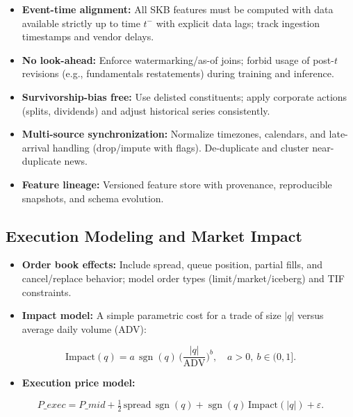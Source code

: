 \documentclass[11pt,a4paper]{article}
\begin{document}
\begin{itemize}
\item   \textbf{Event-time alignment:} All SKB features must be computed with data available strictly up to time $t^{-}$ with explicit data lags; track ingestion timestamps and vendor delays.
\item   \textbf{No look-ahead:} Enforce watermarking/as-of joins; forbid usage of post-$t$ revisions (e.g., fundamentals restatements) during training and inference.
\item   \textbf{Survivorship-bias free:} Use delisted constituents; apply corporate actions (splits, dividends) and adjust historical series consistently.
\item   \textbf{Multi-source synchronization:} Normalize timezones, calendars, and late-arrival handling (drop/impute with flags). De-duplicate and cluster near-duplicate news.
\item   \textbf{Feature lineage:} Versioned feature store with provenance, reproducible snapshots, and schema evolution.

\end{itemize}
\subsection{Execution Modeling and Market Impact}

\begin{itemize}
\item   \textbf{Order book effects:} Include spread, queue position, partial fills, and cancel/replace behavior; model order types (limit/market/iceberg) and TIF constraints.
\item   \textbf{Impact model:} A simple parametric cost for a trade of size $|q|$ versus average daily volume (ADV):

\end{itemize}
\begin{equation}
\text{Impact}(q) = a\,\operatorname{sgn}(q)\,\Big(\frac{|q|}{\mathrm{ADV}}\Big)^b,\quad a>0,\ b\in(0,1].
\end{equation}

\begin{itemize}
\item   \textbf{Execution price model:}

\end{itemize}
\begin{equation}
P\_{exec} = P\_{mid} + \tfrac{1}{2}\,\text{spread}\,\operatorname{sgn}(q) + \operatorname{sgn}(q)\,\text{Impact}(|q|) + \varepsilon.
\end{equation}
\end{document}
